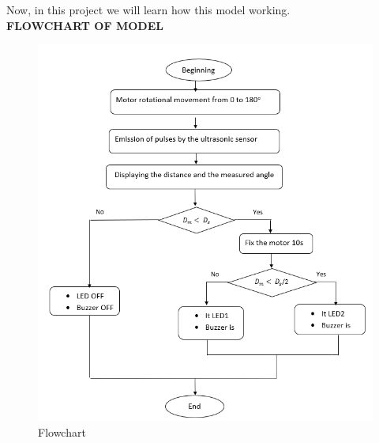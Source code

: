 \documentclass[13pt,a4paper]{report}
\begin{document}
                    \par Now, in this project we will learn how this model working. \\
                    \vspace{3mm}
                    \Large{\textbf{FLOWCHART OF MODEL}}
                    \begin{figure}[H]
                        \centering
                        \includegraphics[width=\linewidth]{flowchart1.png}
                        \caption{\label{fig:pic}Flowchart}
                    \end{figure}
\end{document}

